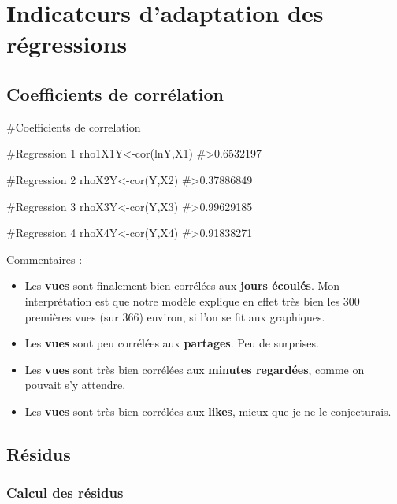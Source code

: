 \hypertarget{indicateurs-dadaptation-des-ruxe9gressions}{%
\section{Indicateurs d'adaptation des
régressions}\label{indicateurs-dadaptation-des-ruxe9gressions}}

\hypertarget{coefficients-de-corruxe9lation}{%
\subsection{Coefficients de
corrélation}\label{coefficients-de-corruxe9lation}}

\begin{Schunk}
\begin{Sinput}
#Coefficients de correlation

#Regression 1
rho1X1Y<-cor(lnY,X1)
#>0.6532197

#Regression 2
rhoX2Y<-cor(Y,X2)
#>0.37886849

#Regression 3
rhoX3Y<-cor(Y,X3)
#>0.99629185

#Regression 4
rhoX4Y<-cor(Y,X4)
#>0.91838271
\end{Sinput}
\end{Schunk}

Commentaires :

\begin{itemize}
\tightlist
\item
  Les \textbf{vues} sont finalement bien corrélées aux \textbf{jours
  écoulés}. Mon interprétation est que notre modèle explique en effet
  très bien les 300 premières vues (sur 366) environ, si l'on se fit aux
  graphiques.
\item
  Les \textbf{vues} sont peu corrélées aux \textbf{partages}. Peu de
  surprises.
\item
  Les \textbf{vues} sont très bien corrélées aux \textbf{minutes
  regardées}, comme on pouvait s'y attendre.
\item
  Les \textbf{vues} sont très bien corrélées aux \textbf{likes}, mieux
  que je ne le conjecturais.
\end{itemize}

\hypertarget{ruxe9sidus}{%
\subsection{Résidus}\label{ruxe9sidus}}

\hypertarget{calcul-des-ruxe9sidus}{%
\subsubsection{Calcul des résidus}\label{calcul-des-ruxe9sidus}}

